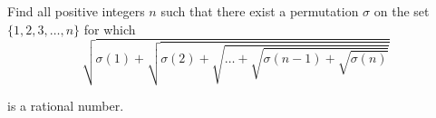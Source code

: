 Find all positive integers $n$ such that there exist a permutation $\sigma$ on the set $\{1,2,3, \ldots, n\}$ for which\[\sqrt{\sigma(1)+\sqrt{\sigma(2)+\sqrt{\ldots+\sqrt{\sigma(n-1)+\sqrt{\sigma(n)}}}}}\]

is a rational number.